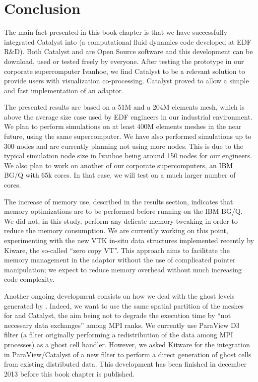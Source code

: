 \section{Conclusion}
\label{sec:conclusion}

The main fact presented in this book chapter is that we have successfully
integrated Catalyst into \CS (a computational fluid dynamics code
developed at EDF R\&D). Both Catalyst and \CS are Open Source software
and this development can be download, used or tested freely by everyone. After
testing the prototype in our corporate supercomputer Ivanhoe, we find Catalyst to
be a relevant solution to provide \CS users with visualization
co-processing. Catalyst proved to allow a simple and fast implementation of an
adaptor.

The presented results are based on a 51M and a 204M elements mesh, which is
above the average size case used by EDF engineers in our industrial environment.
We plan to perform simulations on at least 400M elements meshes in the near
future, using the same supercomputer. We have also performed simulations up to
300 nodes and are currently planning not using more nodes. This is due to the
typical simulation node size in Ivanhoe being around 150 nodes for our
engineers. We also plan to work on another of our corporate supercomputers, an
IBM BG/Q with 65k cores. In that case, we will test on a much larger number of
cores.

The increase of memory use, described in the results section, indicates that
memory optimizations are to be performed before running on the IBM BG/Q. We did
not, in this study, perform any delicate memory tweaking in order to reduce the
memory consumption. We are currently working on this point, experimenting with
the new VTK in-situ data structures implemented recently by Kiware, the
so-called ``zero copy VT''. This approach aims to facilitate the memory
management in the adaptor without the use of complicated pointer manipulation;
we expect to reduce memory overhead without much increasing code complexity.

Another ongoing development consists on how we deal with the ghost levels
generated by \CS. Indeed, we want to use the same spatial partition of
the meshes for \CS and Catalyst, the aim being not to degrade the
execution time by “not necessary data exchanges” among MPI ranks. We currently
use ParaView D3 filter (a filter originally performing a redistribution of the
data among MPI processes) as a ghost cell handler. However, we asked Kitware for
the integration in ParaView/Catalyst of a new filter to perform a direct
generation of ghost cells from existing distributed data. This development has
been finished in december 2013 before this book chapter is published.

